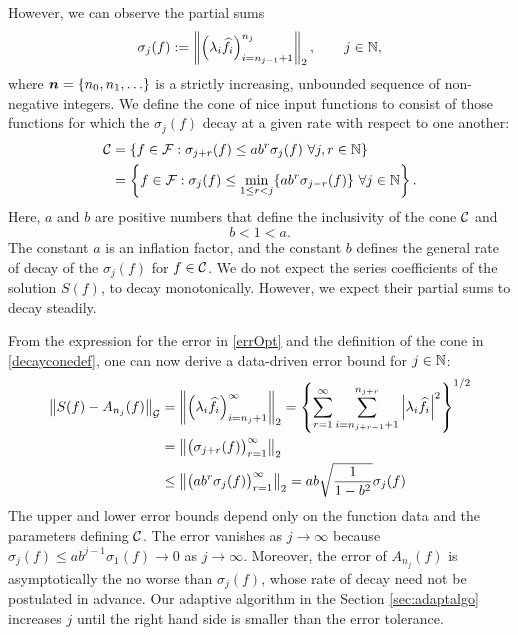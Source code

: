 \documentclass[final]{elsarticle}
\theoremstyle{definition}
\theoremstyle{remark}
\begin{document}
However, we can observe the partial sums 
\begin{equation} \label{sumdef}
\sigma_j(f) :
= \norm[2]{ \left(\lambda_{i} \hf_{i} \right)_{i=n_{j-1}+1}^{n_j}}, \qquad j \in \naturals,
\end{equation}
where $\vn  = \{n_0, n_1, \ldots\}$ is a strictly increasing, unbounded sequence of non-negative integers.  We define the cone of nice input functions to consist of those functions for which the $\sigma_j(f)$ decay at a given rate with respect to one another:
\begin{align} \label{decayconedef}
\cc &= \left\{ f \in \cf : \sigma_{j+r}(f) \le ab^r \sigma_j (f) \ \forall j,r \in \naturals \right\} \\
\nonumber
& = \left\{ f \in \cf : \sigma_j(f) \le \min_{1 \le r < j}\{ab^r\sigma_{j-r}(f)\} \ \forall j \in \naturals \right\}.
\end{align}
Here, $a$ and $b$ are positive numbers that define the inclusivity of the cone $\cc$ and 
\begin{equation} \label{abcond}
b <1 < a.
\end{equation}
The constant $a$ is an inflation factor, and the constant $b$ defines the general rate of decay of the $\sigma_j(f)$ for $f \in \cc$. We do not expect the series coefficients of the solution $S(f)$, to decay monotonically. However, we expect their partial sums to decay steadily.

From the expression for the error in \eqref{errOpt} and the definition of the cone in  \eqref{decayconedef}, one can now derive a data-driven error bound for $j \in \naturals$:
\begin{align}
\nonumber
\norm[\cg]{S(f)-A_{n_j}(f)} &= \norm[2]{\left(\lambda_{i} \hf_{i} \right)_{i = n_j+1}^\infty} = \left\{\sum_{r=1}^\infty \sum_{i=n_{j+r-1}+1}^{n_{j+r}}  \abs{\lambda_{i}\hf_{i} }^{2}  \right\}^{1/2}\\
\nonumber
&= \norm[2]{ \bigl(\sigma_{j+r}(f)\bigr)_{r=1}^{\infty}} \\
&\le \norm[2]{ \bigl(ab^r\sigma_{j}(f)\bigr)_{r=1}^{\infty}}
 = \displaystyle ab \sqrt{\frac{1}{1 - b^2}}\sigma_{j}(f)
 \label{algoineq}
\end{align}
The upper and lower error bounds depend only on the function data and the parameters defining $\cc$.  The error vanishes as $j \to \infty$ because $\sigma_j(f) \le ab^{j-1} \sigma_1(f) \to 0$ as $j \to \infty$.  Moreover, the error of $A_{n_j}(f)$ is asymptotically the no worse than $\sigma_j(f)$, whose rate of decay need not be postulated in advance. Our adaptive algorithm in the Section \ref{sec:adaptalgo} increases $j$ until the right hand side is smaller than the error tolerance.
\end{document}
